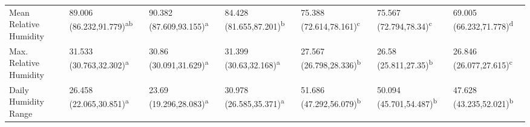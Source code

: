 \documentclass[12pt]{article}
\begin{document}
\begin{sidewaystable}[h!]
{\begin{tabular}{l|lll|lll}
Mean Relative Humidity  & 89.006 (86.232,91.779)\textsuperscript{ab} & 90.382 (87.609,93.155)\textsuperscript{a} & 84.428 (81.655,87.201)\textsuperscript{b} & 75.388 (72.614,78.161)\textsuperscript{c} & 75.567 (72.794,78.34)\textsuperscript{c}   & 69.005 (66.232,71.778)\textsuperscript{d} \\
Max. Relative Humidity  & 31.533 (30.763,32.302)\textsuperscript{a}  & 30.86 (30.091,31.629)\textsuperscript{a}  & 31.399 (30.63,32.168)\textsuperscript{a}  & 27.567 (26.798,28.336)\textsuperscript{b} & 26.58 (25.811,27.35)\textsuperscript{b}    & 26.846 (26.077,27.615)\textsuperscript{c} \\
Daily Humidity Range    & 26.458 (22.065,30.851)\textsuperscript{a}  & 23.69 (19.296,28.083)\textsuperscript{a}  & 30.978 (26.585,35.371)\textsuperscript{a} & 51.686 (47.292,56.079)\textsuperscript{b} & 50.094 (45.701,54.487)\textsuperscript{b}  & 47.628 (43.235,52.021)\textsuperscript{b}
\end{tabular}}
  \label{table:climate}
\end{sidewaystable}
\end{document}
